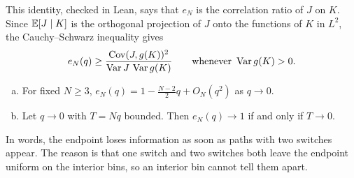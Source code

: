 This identity, checked in Lean, says that $e_N$ is the correlation ratio of
$J$ on $K$. Since $\mathbb E[J\mid K]$ is the orthogonal projection of $J$ onto
the functions of $K$ in $L^2$, the Cauchy--Schwarz inequality gives
\begin{equation}\label{eq:fisher-proj}
 e_N(q)\ge\frac{\operatorname{Cov}(J,g(K))^2}{\operatorname{Var} J\,\operatorname{Var} g(K)}
 \qquad\text{whenever }\operatorname{Var} g(K)>0.
\end{equation}

\begin{proposition}\label{rem:fisher-small}
\begin{enumerate}[(a)]
\item For fixed $N\ge3$, $e_N(q)=1-\frac{N-2}2q+O_N(q^2)$ as $q\to0$.
\item Let $q\to0$ with $T=Nq$ bounded. Then $e_N(q)\to1$ if and only if
$T\to0$.
\end{enumerate}
\end{proposition}

In words, the endpoint loses information as soon as paths with two switches
appear. The reason is that one switch and two switches both leave the endpoint
uniform on the interior bins, so an interior bin cannot tell them apart.


